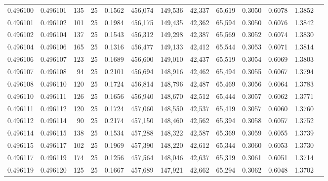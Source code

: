 \begin{tabular}{rrrrrrrrrrrrr}
0.496100 & 0.496101 &   135 &  25 &                                     0.1562 & 456,074 & 149,536 &  42,337 &  65,619 & 0.3050 & 0.6078 & 1.3852 \\
0.496101 & 0.496102 &   101 &  25 &                                     0.1984 & 456,175 & 149,435 &  42,362 &  65,594 & 0.3050 & 0.6076 & 1.3842 \\
0.496102 & 0.496104 &   137 &  25 &                                     0.1543 & 456,312 & 149,298 &  42,387 &  65,569 & 0.3052 & 0.6074 & 1.3830 \\
0.496104 & 0.496106 &   165 &  25 &                                     0.1316 & 456,477 & 149,133 &  42,412 &  65,544 & 0.3053 & 0.6071 & 1.3814 \\
0.496106 & 0.496107 &   123 &  25 &                                     0.1689 & 456,600 & 149,010 &  42,437 &  65,519 & 0.3054 & 0.6069 & 1.3803 \\
0.496107 & 0.496108 &    94 &  25 &                                     0.2101 & 456,694 & 148,916 &  42,462 &  65,494 & 0.3055 & 0.6067 & 1.3794 \\
0.496108 & 0.496110 &   120 &  25 &                                     0.1724 & 456,814 & 148,796 &  42,487 &  65,469 & 0.3056 & 0.6064 & 1.3783 \\
0.496110 & 0.496111 &   126 &  25 &                                     0.1656 & 456,940 & 148,670 &  42,512 &  65,444 & 0.3057 & 0.6062 & 1.3771 \\
0.496111 & 0.496112 &   120 &  25 &                                     0.1724 & 457,060 & 148,550 &  42,537 &  65,419 & 0.3057 & 0.6060 & 1.3760 \\
0.496112 & 0.496114 &    90 &  25 &                                     0.2174 & 457,150 & 148,460 &  42,562 &  65,394 & 0.3058 & 0.6057 & 1.3752 \\
0.496114 & 0.496115 &   138 &  25 &                                     0.1534 & 457,288 & 148,322 &  42,587 &  65,369 & 0.3059 & 0.6055 & 1.3739 \\
0.496115 & 0.496117 &   102 &  25 &                                     0.1969 & 457,390 & 148,220 &  42,612 &  65,344 & 0.3060 & 0.6053 & 1.3730 \\
0.496117 & 0.496119 &   174 &  25 &                                     0.1256 & 457,564 & 148,046 &  42,637 &  65,319 & 0.3061 & 0.6051 & 1.3714 \\
0.496119 & 0.496120 &   125 &  25 &                                     0.1667 & 457,689 & 147,921 &  42,662 &  65,294 & 0.3062 & 0.6048 & 1.3702 \\

\end{tabular}
